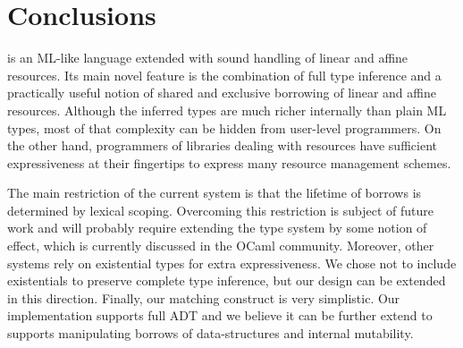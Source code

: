 
\section{Conclusions}
\label{sec:conclusions}

\lang is an ML-like language extended with sound handling of linear and affine resources. Its main novel feature is the combination of full type inference and a practically useful notion of shared and exclusive borrowing of linear and affine resources.
Although the inferred types are much richer internally than plain ML types, most of that complexity can be hidden from user-level programmers. On the other hand, programmers of libraries dealing with resources have sufficient expressiveness at their fingertips to express many resource management schemes.

The main restriction of the current system is that the lifetime of borrows is determined by lexical scoping. Overcoming this restriction is subject of future work and will probably require extending the type system by some notion of effect, which is currently discussed in the OCaml community. 
Moreover, other systems rely on existential types for extra expressiveness. We chose not to include existentials to preserve complete type inference, but our design can be extended in this direction.
Finally, our matching construct is very simplistic.
Our implementation supports full ADT and we believe it
can be further extend to supports manipulating borrows of data-structures and
internal mutability.

